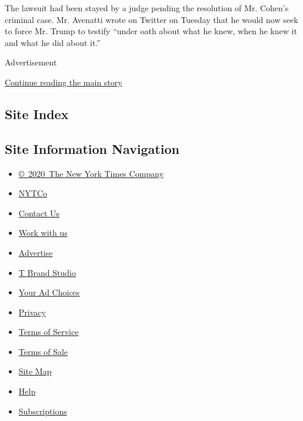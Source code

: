 The lawsuit had been stayed by a judge pending the resolution of Mr.
Cohen's criminal case. Mr. Avenatti wrote on Twitter on Tuesday that he
would now seek to force Mr. Trump to testify ``under oath about what he
knew, when he knew it and what he did about it.''

Advertisement

\protect\hyperlink{after-bottom}{Continue reading the main story}

\hypertarget{site-index}{%
\subsection{Site Index}\label{site-index}}

\hypertarget{site-information-navigation}{%
\subsection{Site Information
Navigation}\label{site-information-navigation}}

\begin{itemize}
\tightlist
\item
  \href{https://help.nytimes.com/hc/en-us/articles/115014792127-Copyright-notice}{©~2020~The
  New York Times Company}
\end{itemize}

\begin{itemize}
\tightlist
\item
  \href{https://www.nytco.com/}{NYTCo}
\item
  \href{https://help.nytimes.com/hc/en-us/articles/115015385887-Contact-Us}{Contact
  Us}
\item
  \href{https://www.nytco.com/careers/}{Work with us}
\item
  \href{https://nytmediakit.com/}{Advertise}
\item
  \href{http://www.tbrandstudio.com/}{T Brand Studio}
\item
  \href{https://www.nytimes.com/privacy/cookie-policy\#how-do-i-manage-trackers}{Your
  Ad Choices}
\item
  \href{https://www.nytimes.com/privacy}{Privacy}
\item
  \href{https://help.nytimes.com/hc/en-us/articles/115014893428-Terms-of-service}{Terms
  of Service}
\item
  \href{https://help.nytimes.com/hc/en-us/articles/115014893968-Terms-of-sale}{Terms
  of Sale}
\item
  \href{https://spiderbites.nytimes.com}{Site Map}
\item
  \href{https://help.nytimes.com/hc/en-us}{Help}
\item
  \href{https://www.nytimes.com/subscription?campaignId=37WXW}{Subscriptions}
\end{itemize}

